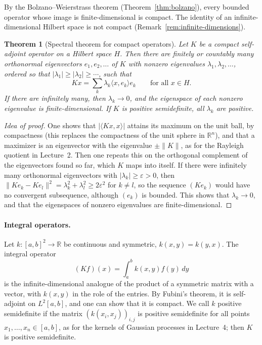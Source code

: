 \documentclass[11pt]{article}
\newcommand{\norm}[1]{\lVert #1 \rVert}
\newcommand{\ip}[2]{\langle #1, #2 \rangle}
\theoremstyle{definition}
\theoremstyle{plain}
\newtheorem{theorem}[definition]{Theorem}
\theoremstyle{remark}
\begin{document}
By the Bolzano--Weierstrass theorem (Theorem~\ref{thm:bolzano}), every bounded operator whose image is finite-dimensional is compact. The identity of an infinite-dimensional Hilbert space is not compact (Remark~\ref{rem:infinite-dimensions}).

\begin{theorem}[Spectral theorem for compact operators]\label{thm:spectral-compact}
    Let $K$ be a compact self-adjoint operator on a Hilbert space $H$. Then there are finitely or countably many orthonormal eigenvectors $e_1, e_2, \ldots$ of $K$ with nonzero eigenvalues $\lambda_1, \lambda_2, \ldots$, ordered so that $|\lambda_1| \geq |\lambda_2| \geq \cdots$, such that
    \[Kx = \sum_k \lambda_k\ip{x}{e_k}e_k \qquad \text{for all } x \in H.\]
    If there are infinitely many, then $\lambda_k \to 0$, and the eigenspace of each nonzero eigenvalue is finite-dimensional. If $K$ is positive semidefinite, all $\lambda_k$ are positive.
\end{theorem}

\begin{proof}[Idea of proof]
    One shows that $|\ip{Kx}{x}|$ attains its maximum on the unit ball, by compactness (this replaces the compactness of the unit sphere in $\mathbb{R}^n$), and that a maximizer is an eigenvector with the eigenvalue $\pm\norm{K}$, as for the Rayleigh quotient in Lecture~2. Then one repeats this on the orthogonal complement of the eigenvectors found so far, which $K$ maps into itself. If there were infinitely many orthonormal eigenvectors with $|\lambda_k| \geq \varepsilon > 0$, then $\norm{Ke_k - Ke_l}^2 = \lambda_k^2 + \lambda_l^2 \geq 2\varepsilon^2$ for $k \neq l$, so the sequence $(Ke_k)$ would have no convergent subsequence, although $(e_k)$ is bounded. This shows that $\lambda_k \to 0$, and that the eigenspaces of nonzero eigenvalues are finite-dimensional.
\end{proof}

\paragraph{Integral operators.} Let $k: [a, b]^2 \to \mathbb{R}$ be continuous and symmetric, $k(x, y) = k(y, x)$. The integral operator
\[(Kf)(x) = \int_a^b k(x, y)f(y)\, dy\]
is the infinite-dimensional analogue of the product of a symmetric matrix with a vector, with $k(x, y)$ in the role of the entries. By Fubini's theorem, it is self-adjoint on $L^2[a, b]$, and one can show that it is compact. We call $k$ positive semidefinite if the matrix $(k(x_i, x_j))_{i, j}$ is positive semidefinite for all points $x_1, \ldots, x_n \in [a, b]$, as for the kernels of Gaussian processes in Lecture~4; then $K$ is positive semidefinite.
\end{document}
